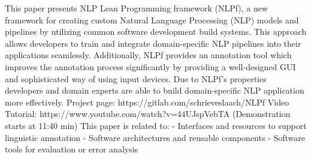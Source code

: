 This paper presents NLP Lean Programming framework (NLPf), a new framework for creating custom Natural Language Processing (NLP) models and pipelines by utilizing common software development build systems. This approach allows developers to train and integrate domain-specific NLP pipelines into their applications seamlessly. Additionally, NLPf provides an annotation tool which improves the annotation process significantly by providing a well-designed GUI and sophisticated way of using input devices. Due to NLPf's properties developers and domain experts are able to build domain-specific NLP application more effectively. Project page:   https://gitlab.com/schrieveslaach/NLPf Video Tutorial: https://www.youtube.com/watch?v=44UJspVebTA (Demonstration starts at 11:40 min) This paper is related to: - Interfaces and resources to support linguistic annotation - Software architectures and reusable components - Software tools for evaluation or error analysis
